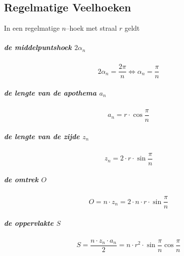  \subsection{Regelmatige Veelhoeken}
 \label{sec:reg_veelh}
  In een regelmatige $n$--hoek met straal $r$ geldt
   
\subparagraph{de middelpuntshoek $2\alpha_n$}
\label{sec:MiddelpuntshoekRegVeelh}
   \[
	    2\alpha_n = \frac{2\pi}{n} \Leftrightarrow \alpha_n= \frac{\pi}{n}
   \]
  
\subparagraph{de lengte van de apothema $a_n$}
\label{sec:LengteApothemaRegVeelh}
   \[
	   a_n= r \cdot \cos \frac{\pi}{n}
   \]   
   
\subparagraph{de lengte van de zijde $z_n$}
\label{sec:LengteZijdeRegVeelh}
   \[
	   z_n= 2 \cdot r \cdot \sin \frac{\pi}{n}
   \]   
   
\subparagraph{de omtrek $O$}
\label{sec:OmtrekRegVeelh}
   \[
     O = n \cdot z_n = 2 \cdot n \cdot r \cdot \sin \frac{\pi}{n}
   \]
   
\subparagraph{de oppervlakte $S$}
\label{sec:OppervlakteRegVeelh}
   \[
     S = \frac{n \cdot z_n \cdot a_n}{2} = n \cdot r^2 \cdot \sin\frac{\pi}{n}\cos\frac{\pi}{n}
   \]